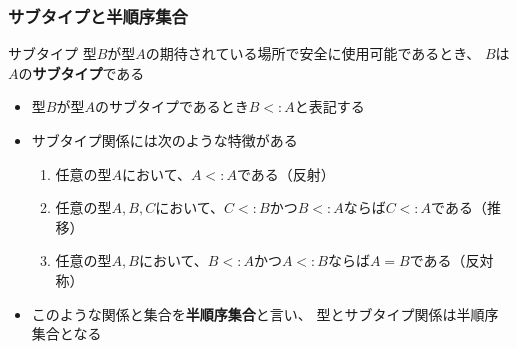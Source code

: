 \begin{frame}
  \frametitle{サブタイプと半順序集合}

  \pause
  \begin{block}{サブタイプ}
    型$B$が型$A$の期待されている場所で安全に使用可能であるとき、
    $B$は$A$の\textbf{サブタイプ}である

    \begin{itemize}
      \item 型$B$が型$A$のサブタイプであるとき$B <: A$と表記する
    \end{itemize}
  \end{block}

  \pause
  \begin{itemize}
    \item<+-> サブタイプ関係には次のような特徴がある
    \begin{enumerate}
      \item<+-> 任意の型$A$において、$A <: A$である（反射）
      \item<+-> 任意の型$A, B, C$において、$C <: B$かつ$B <: A$ならば$C <: A$である（推移）
      \item<+-> 任意の型$A, B$において、$B <: A$かつ$A <: B$ならば$A = B$である（反対称）
    \end{enumerate}

    \item<+-> このような関係と集合を\textbf{半順序集合}と言い、
    型とサブタイプ関係は半順序集合となる
  \end{itemize}
\end{frame}

